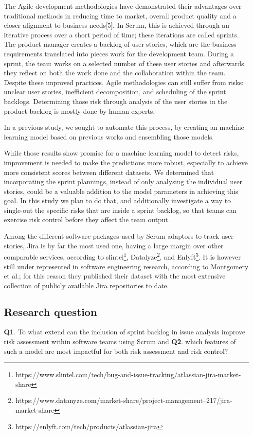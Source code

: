 \documentclass[sigconf]{acmart}
\begin{document}
The Agile development methodologies have demonstrated their advantages over traditional methods in reducing time to market, overall product quality and a closer alignment to business needs[5]. 
In Scrum, this is achieved through an iterative process over a short period of time; these iterations are called sprints.
The product manager creates a backlog of user stories, which are the business requirements translated into pieces work for the development team. 
During a sprint, the team works on a selected number of these user stories and afterwards they reflect on both the work done and the collaboration within the team.
Despite these improved practices, Agile methodologies can still suffer from risks: unclear user stories, inefficient decomposition, and scheduling of the sprint backlogs. 
Determining those risk through analysis of the user stories in the product backlog is mostly done by human experts. 

In a previous study, we sought to automate this process, by creating an machine learning model based on previous works and ensembling those models. 

While those results show promise for a machine learning model to detect risks, improvement is needed to make the predictions more robust, especially to achieve more consistent scores between different datasets.
We determined that incorporating the sprint plannings, instead of only analysing the individual user stories, could be a valuable addition to the model parameters in achieving this goal. In this study we plan to do that, and additionally investigate a way to single-out the specific risks that are inside a sprint backlog, so that teams can exercise risk control before they affect the team output.

Among the different software packages used by Scrum adaptors to track user stories, Jira is by far the most used one, having a large margin over other comparable services, according to slintel\footnote{https://www.slintel.com/tech/bug-and-issue-tracking/atlassian-jira-market-share}, Datalyze\footnote{https://www.datanyze.com/market-share/project-management--217/jira-market-share}, and Enlyft\footnote{https://enlyft.com/tech/products/atlassian-jira}. It is however still under represented in software engineering research, according to Montgomery et al.\cite{montgomery2022jira}; for this reason they published their dataset with the most extensive collection of publicly available Jira repositories to date.

\subsection{Research question}
\textbf{Q1}. To what extend can the inclusion of sprint backlog in issue analysis improve risk assessment within software teams using Scrum and \textbf{Q2}. which features of such a model are most impactful for both risk assessment and risk control?
\end{document}
